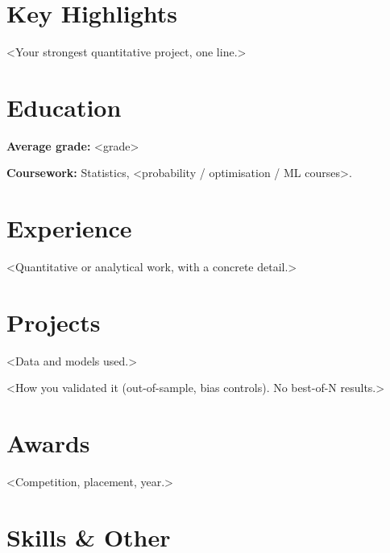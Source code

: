\documentclass{cv}
\begin{document}
\makecvheader

\section{Key Highlights}
\begin{bullets}
  \item <Your strongest quantitative project, one line.> %
\end{bullets}

\section{Education}
\begin{bullets}
  \item \textbf{Average grade:} <grade> %
  \item \textbf{Coursework:} Statistics, <probability / optimisation / ML courses>. %
\end{bullets}

\section{Experience}
\begin{bullets}
  \item <Quantitative or analytical work, with a concrete detail.> %
\end{bullets}

\section{Projects}
\begin{bullets}
  \item <Data and models used.> %
  \item <How you validated it (out-of-sample, bias controls). No best-of-N results.> %
\end{bullets}

\section{Awards}
\begin{bullets}
  \item <Competition, placement, year.> %
\end{bullets}

\section{Skills \& Other}
\begin{skilltable}
\end{skilltable}
\end{document}
